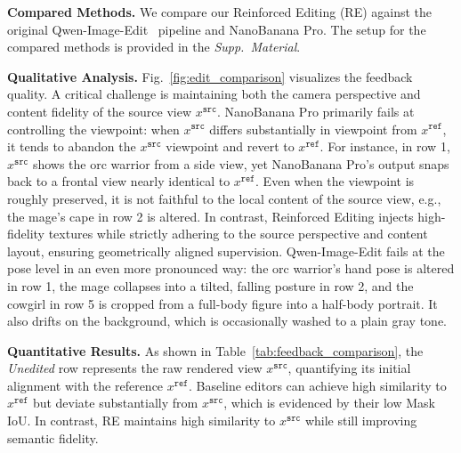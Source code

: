 \documentclass[runningheads]{llncs}
\begin{document}
\textbf{Compared Methods.}
We compare our Reinforced Editing (RE) against the original Qwen-Image-Edit~\cite{wu2025qwen} pipeline and NanoBanana Pro.
The setup for the compared methods is provided in the \emph{Supp.\ Material}.



\textbf{Qualitative Analysis.}
Fig.~\ref{fig:edit_comparison} visualizes the feedback quality. A critical challenge is maintaining both the camera perspective and content fidelity of the source view $x^{\texttt{src}}$.
NanoBanana Pro primarily fails at controlling the viewpoint: when $x^{\texttt{src}}$ differs substantially in viewpoint from $x^{\texttt{ref}}$, it tends to abandon the $x^{\texttt{src}}$ viewpoint and revert to $x^{\texttt{ref}}$.
For instance, in row 1, $x^{\texttt{src}}$ shows the orc warrior from a side view, yet NanoBanana Pro's output snaps back to a frontal view nearly identical to $x^{\texttt{ref}}$.
Even when the viewpoint is roughly preserved, it is not faithful to the local content of the source view, e.g., the mage's cape in row 2 is altered.
In contrast, Reinforced Editing injects high-fidelity textures while strictly adhering to the source perspective and content layout, ensuring geometrically aligned supervision.
Qwen-Image-Edit fails at the pose level in an even more pronounced way: the orc warrior's hand pose is altered in row 1, the mage collapses into a tilted, falling posture in row 2, and the cowgirl in row 5 is cropped from a full-body figure into a half-body portrait. 
It also drifts on the background, which is occasionally washed to a plain gray tone.

\textbf{Quantitative Results.}
As shown in Table~\ref{tab:feedback_comparison}, the \textit{Unedited} row represents the raw rendered view $x^{\texttt{src}}$, quantifying its initial alignment with the reference $x^{\texttt{ref}}$.
Baseline editors can achieve high similarity to $x^{\texttt{ref}}$ but deviate substantially from $x^{\texttt{src}}$, which is evidenced by their low Mask IoU.
In contrast, RE maintains high similarity to $x^{\texttt{src}}$ while still improving semantic fidelity.
\end{document}
